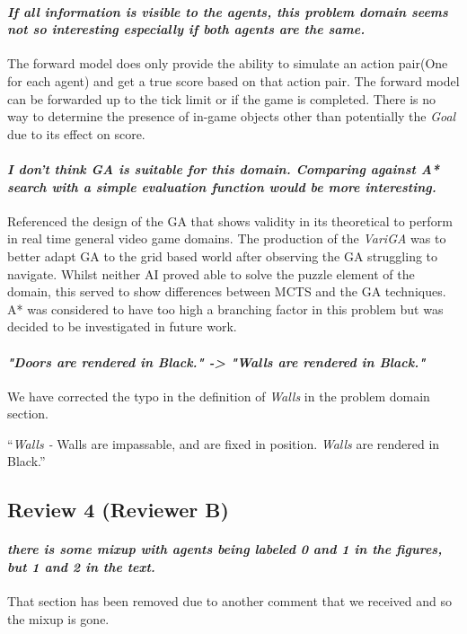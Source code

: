 \documentclass{article}
\begin{document}
\paragraph*{\textit{If all information is visible to the agents,
this problem domain seems not so interesting especially if
both agents are the same.}}
The forward model does only provide the ability to simulate an action pair(One for each agent) and get a true score based on that action pair. The forward model can be forwarded up to the tick limit or if the game is completed. There is no way to determine the presence of in-game objects other than potentially the \emph{Goal} due to its effect on score.
\paragraph*{\textit{I don't think GA is suitable for this domain.
Comparing against A* search with a simple evaluation function would be more interesting.}}
Referenced the design of the GA that shows validity in its theoretical to perform in real time general video game domains. The production of the \emph{VariGA} was to better adapt GA to the grid based world after observing the GA struggling to navigate. Whilst neither AI proved able to solve the puzzle element of the domain, this served to show differences between MCTS and the GA techniques. A* was considered to have too high a branching factor in this problem but was decided to be investigated in future work.

\paragraph*{\textit{"Doors are rendered in Black." -> "Walls are rendered in Black."}}
We have corrected the typo in the definition of \emph{Walls} in the problem domain section.

``\emph{Walls -} Walls are impassable, and are fixed in position. \emph{Walls} are rendered in Black.''
\subsection{Review 4 (Reviewer B)}
\paragraph*{\textit{there is some mixup with agents being labeled 0 and 1 in the figures, but 1 and 2 in the text.}}
That section has been removed due to another comment that we received and so the mixup is gone.
\end{document}
